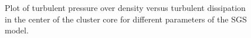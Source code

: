 \begin{figure}[tp]
\centering
{}
\caption{Plot of turbulent pressure over density versus turbulent dissipation
in the center of the cluster core for different parameters of the SGS model.}
\end{figure}

